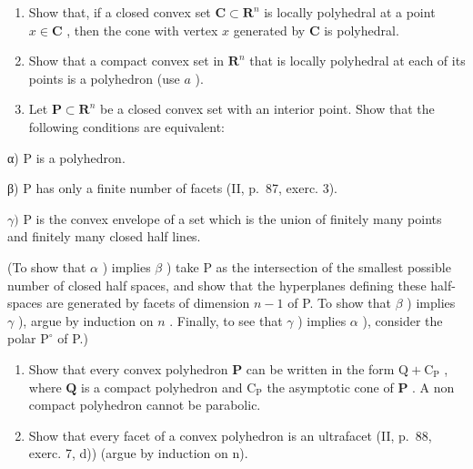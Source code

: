 \begin{enumerate}
\def\labelenumi{\alph{enumi})}
\item
  Show that, if a closed convex set \(\mathbf{C} \subset \mathbf{R}^n\) is locally polyhedral at a point \(x \in \mathbf{C}\) , then the cone with vertex \(x\) generated by \(\mathbf{C}\) is polyhedral.
\item
  Show that a compact convex set in \(\mathbf{R}^n\) that is locally polyhedral at each of its points is a polyhedron (use \(a\) ).
\item
  Let \(\mathbf{P} \subset \mathbf{R}^n\) be a closed convex set with an interior point. Show that the following conditions are equivalent:
\end{enumerate}

α) P is a polyhedron.

β) P has only a finite number of facets (II, p.~87, exerc. 3).

\(\gamma)\) P is the convex envelope of a set which is the union of finitely many points and finitely many closed half lines.

(To show that \(\alpha\) ) implies \(\beta\) ) take P as the intersection of the smallest possible number of closed half spaces, and show that the hyperplanes defining these half-spaces are generated by facets of dimension \(n - 1\) of P. To show that \(\beta\) ) implies \(\gamma\) ), argue by induction on \(n\) . Finally, to see that \(\gamma\) ) implies \(\alpha\) ), consider the polar \(\mathrm{P}^{\circ}\) of P.)

\begin{enumerate}
\def\labelenumi{\alph{enumi})}
\setcounter{enumi}{3}
\item
  Show that every convex polyhedron \(\mathbf{P}\) can be written in the form \(\mathrm{Q} + \mathrm{C}_{\mathrm{P}}\) , where \(\mathbf{Q}\) is a compact polyhedron and \(\mathrm{C}_{\mathrm{P}}\) the asymptotic cone of \(\mathbf{P}\) . A non compact polyhedron cannot be parabolic.
\item
  Show that every facet of a convex polyhedron is an ultrafacet (II, p.~88, exerc. 7, d)) (argue by induction on n).
\end{enumerate}


